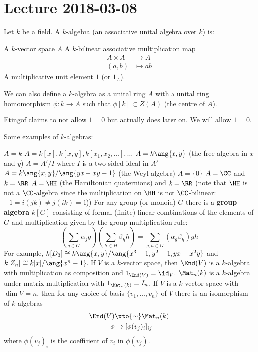 \section{Lecture 2018-03-08}

\begin{defn}
	Let $k$ be a field.
	A $k$-algebra (an associative unital algebra over $k$) is:
	\begin{itm}
		\io A $k$-vector space $A$
		\io A $k$-bilinear associative multiplication map
			\begin{align*}
				A \times A &\to A \\
				(a,b) &\mapsto ab
			\end{align*}
		\io A multiplicative unit element $1$ (or $1_A$).
	\end{itm}
\end{defn}

\begin{rmk}
	We can also define a $k$-algebra as a unital ring $A$ with a unital ring homomorphism $\phi: k \to A$ such that $\phi[k] \subset Z(A)$ (the centre of $A$).
\end{rmk}

\begin{rmk}
	Etingof claims to not allow $1=0$ but actually does later on.
	We will allow $1=0$.
\end{rmk}

\begin{exam}
	Some examples of $k$-algebras:
	\begin{enum}
		\io $A=k$
		\io $A=k[x],k[x,y],k[x_1,x_2,\ldots],\ldots$
		\io $A=k\ang{x,y}$ (the free algebra in $x$ and $y$)
		\io $A=A'/I$ where $I$ is a two-sided ideal in $A'$
		\io $A=k\ang{x,y}/\ang{yx-xy-1}$ (the Weyl algebra)
		\io $A=\{0\}$
		\io $A=\CC$ and $k=\RR$
		\io $A=\HH$ (the Hamiltonian quaternions) and $k=\RR$ (note that $\HH$ is not a $\CC$-algebra since the multiplication on $\HH$ is not $\CC$-bilinear: $-1=i(jk)\neq j(ik)=1$))
		\io For any group (or monoid) $G$ there is a \textbf{group algebra} $k[G]$ consisting of formal (finite) linear combinations of the elements of $G$ and multiplication given by the group multiplication rule:
		\[\left(\sum_{g\in G}\alpha_gg\right)\left(\sum_{h\in H}\beta_hh\right)=\sum_{g,h\in G}(\alpha_g\beta_h)gh\]
		For example, $k[D_3]\cong k\ang{x,y}/\ang{x^3-1,y^2-1,yx-x^2y}$ and $k[Z_n]\cong k[x]/\ang{x^n-1}$.
		\io If $V$ is a $k$-vector space, then $\End(V)$ is a $k$-algebra with multiplication as composition and $1_{\End(V)}=\id_V$.
		\io $\Mat_n(k)$ is a $k$-algebra under matrix multiplication with $1_{\Mat_n(k)}=I_n$.
		If $V$ is a $k$-vector space with $\dim V=n$, then for any choice of basis $\{v_1,\ldots,v_n\}$ of $V$ there is an isomorphism of $k$-algebras
		\begin{align*}
			\End(V) &\xto{\sim} \Mat_n(k) \\
			\phi &\mapsto [\phi(v_j)_i]_{ij}
		\end{align*}
		where $\phi(v_j)_i$ is the coefficient of $v_i$ in $\phi(v_j)$.
	\end{enum}
\end{exam}

